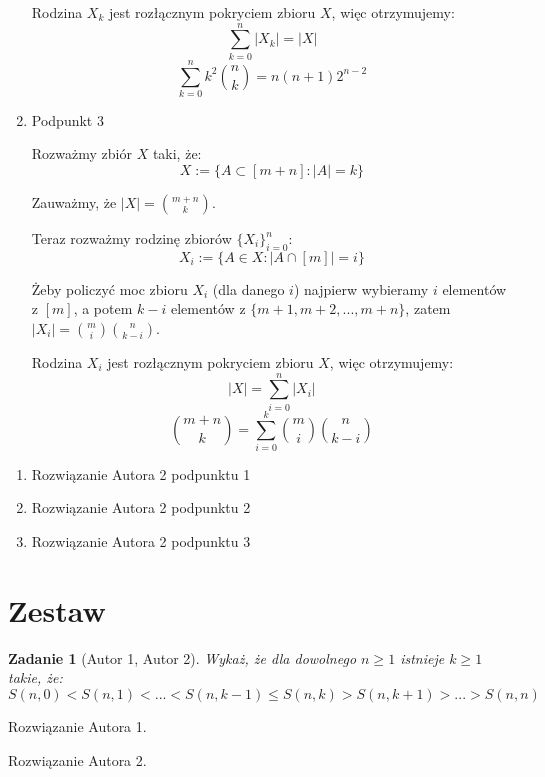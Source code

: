 \documentclass{mwart}
\newtheorem{zad}{Zadanie}[section]
\begin{document}
\begin{mdframed}
\begin{enumerate}
              Rodzina $X_k$ jest rozłącznym pokryciem zbioru $X$, więc otrzymujemy:
              \[\sum_{k=0}^{n} |X_k| = |X|\]
              \[\sum_{k=0}^{n}k^2{n \choose k}= n(n+1)2^{n-2}\]

        \item Podpunkt 3

              Rozważmy zbiór $X$ taki, że:
              \[X := \{A \subset [m + n] : |A| = k\}\]

              Zauważmy, że $|X| = {m+n \choose k}$.

              Teraz rozważmy rodzinę zbiorów $\{X_i\}_{i=0}^n$:
              \[X_i := \{A \in X : |A \cap [m]| = i\}\]

              Żeby policzyć moc zbioru $X_i$ (dla danego $i$) najpierw wybieramy $i$ elementów z $[m]$, a potem $k-i$ elementów z
              $\{m+1, m+2, ..., m+n\}$, zatem $|X_i| = {m \choose i}{n \choose k-i}$.

              Rodzina $X_i$ jest rozłącznym pokryciem zbioru $X$, więc otrzymujemy:
              \[|X| = \sum_{i=0}^{n} |X_i|\]
              \[{m+n \choose k} = \sum_{i=0}^{k}{m \choose i}{n \choose k-i}\]

    \end{enumerate}
\end{mdframed}
\begin{mdframed}
    \begin{enumerate}
        \item Rozwiązanie Autora 2 podpunktu 1
        \item Rozwiązanie Autora 2 podpunktu 2
        \item Rozwiązanie Autora 2 podpunktu 3
    \end{enumerate}
\end{mdframed}






















\newpage
\section{Zestaw}          %

\begin{zad}[Autor 1, Autor 2]
    Wykaż, że dla dowolnego $n \geq 1$ istnieje $k \geq 1$ takie, że:
    \[S(n, 0) < S(n, 1) < ... < S(n, k - 1 ) \leq S(n, k) > S(n, k+1) > ... > S(n, n)\]
\end{zad}
\begin{mdframed}
    Rozwiązanie Autora 1.
\end{mdframed}
\begin{mdframed}
    Rozwiązanie Autora 2.
\end{mdframed}
\end{document}
